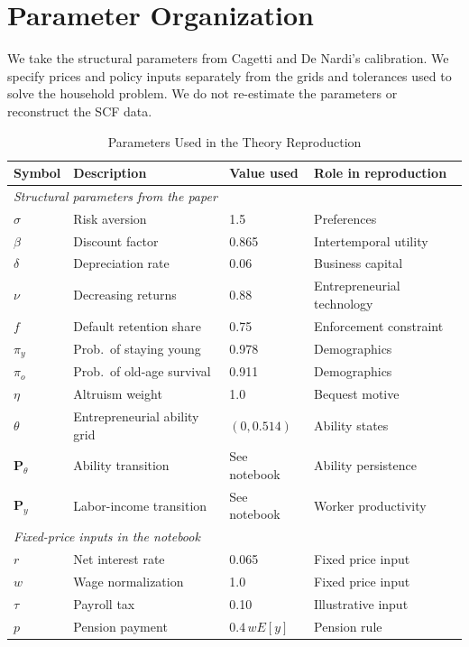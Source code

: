 \documentclass[\latexroot/\projectname]{subfiles}
\begin{document}
\section{Parameter Organization}
\whenintegrated{\label{sec:parameters}}

We take the structural parameters from Cagetti and De Nardi's calibration. We specify prices and policy inputs separately from the grids and tolerances used to solve the household problem. We do not re-estimate the parameters or reconstruct the SCF data.

\begin{table}[htbp]
  \centering
  \caption{Parameters Used in the Theory Reproduction}
  \whenintegrated{\label{tab:calibration}}
  \begin{tabular}{llll}
    \hline\hline
    Symbol & Description & Value used & Role in reproduction \\
    \hline
    \multicolumn{4}{l}{\textit{Structural parameters from the paper}} \\
    \hline
    $\sigma$ & Risk aversion & 1.5 & Preferences \\
    $\beta$ & Discount factor & 0.865 & Intertemporal utility \\
    $\delta$ & Depreciation rate & 0.06 & Business capital \\
    $\nu$ & Decreasing returns & 0.88 & Entrepreneurial technology \\
    $f$ & Default retention share & 0.75 & Enforcement constraint \\
    $\pi_y$ & Prob.\ of staying young & 0.978 & Demographics \\
    $\pi_o$ & Prob.\ of old-age survival & 0.911 & Demographics \\
    $\eta$ & Altruism weight & 1.0 & Bequest motive \\
    $\theta$ & Entrepreneurial ability grid & $(0,0.514)$ & Ability states \\
    $\mathbf{P}_\theta$ & Ability transition & See notebook & Ability persistence \\
    $\mathbf{P}_y$ & Labor-income transition & See notebook & Worker productivity \\
    \hline
    \multicolumn{4}{l}{\textit{Fixed-price inputs in the notebook}} \\
    \hline
    $r$ & Net interest rate & 0.065 & Fixed price input \\
    $w$ & Wage normalization & 1.0 & Fixed price input \\
    $\tau$ & Payroll tax & 0.10 & Illustrative input \\
    $p$ & Pension payment & $0.4\,wE[y]$ & Pension rule \\
    \hline
  \end{tabular}
\end{table}
\end{document}
